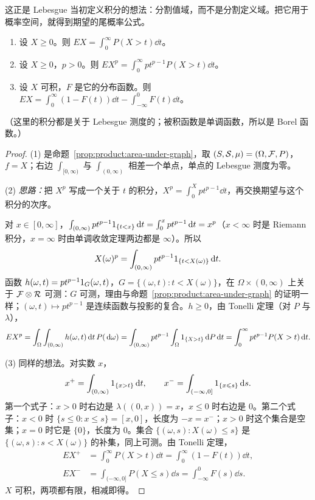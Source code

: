 这正是 Lebesgue 当初定义积分的想法：分割值域，而不是分割定义域。把它用于概率空间，就得到期望的尾概率公式。

\begin{theorem}[期望的尾概率公式]\label{thm:product:tail-formula}
\begin{enumerate}
\item 设 $X\geqslant0$。则 $EX=\int_0^\infty P(X>t)\dd t$。
\item 设 $X\geqslant0$，$p>0$。则 $EX^p=\int_0^\infty pt^{p-1}P(X>t)\dd t$。
\item 设 $X$ 可积，$F$ 是它的分布函数。则 $EX=\int_0^\infty(1-F(t))\dd t-\int_{-\infty}^0F(t)\dd t$。
\end{enumerate}
（这里的积分都是关于 Lebesgue 测度的；被积函数是单调函数，所以是 Borel 函数。）
\end{theorem}
\begin{proof}
(1) 是命题~\ref{prop:product:area-under-graph}，取 $(S,\mathcal{S},\mu)=(\Omega,\mathcal{F},P)$，$f=X$；右边 $\int_{[0,\infty)}$ 与 $\int_{(0,\infty)}$ 相差一个单点，单点的 Lebesgue 测度为零。

(2) \emph{思路：}把 $X^p$ 写成一个关于 $t$ 的积分，$X^p=\int_0^Xpt^{p-1}\dd t$，再交换期望与这个积分的次序。

对 $x\in[0,\infty]$，$\int_{(0,\infty)}pt^{p-1}1_{\{t<x\}}\,\mathrm{d} t=\int_0^xpt^{p-1}\,\mathrm{d} t=x^p$（$x<\infty$ 时是 Riemann 积分，$x=\infty$ 时由单调收敛定理两边都是 $\infty$）。所以
\[
X(\omega)^p=\int_{(0,\infty)}pt^{p-1}1_{\{t<X(\omega)\}}\,\mathrm{d} t .
\]
函数 $h(\omega,t)=pt^{p-1}1_G(\omega,t)$，$G=\{(\omega,t):t<X(\omega)\}$，在 $\Omega\times(0,\infty)$ 上关于 $\mathcal{F}\otimes\mathcal{R}$ 可测：$G$ 可测，理由与命题~\ref{prop:product:area-under-graph} 的证明一样；$(\omega,t)\mapsto pt^{p-1}$ 是连续函数与投影的复合。$h\geqslant0$，由 Tonelli 定理（对 $P$ 与 $\lambda$），
\[
EX^p=\int_\Omega\int_{(0,\infty)}h(\omega,t)\,\mathrm{d} t\,P(\,\mathrm{d}\omega)=\int_{(0,\infty)}pt^{p-1}\int_\Omega1_{\{X>t\}}\,\mathrm{d} P\,\mathrm{d} t=\int_0^\infty pt^{p-1}P(X>t)\,\mathrm{d} t .
\]

(3) 同样的想法。对实数 $x$，
\[
x^+=\int_{(0,\infty)}1_{\{x>t\}}\,\mathrm{d} t,\qquad x^-=\int_{(-\infty,0]}1_{\{x\leqslant s\}}\,\mathrm{d} s .
\]
第一个式子：$x>0$ 时右边是 $\lambda((0,x))=x$，$x\leqslant0$ 时右边是 $0$。第二个式子：$x<0$ 时 $\{s\leqslant0:x\leqslant s\}=[x,0]$，长度为 $-x=x^-$；$x>0$ 时这个集合是空集；$x=0$ 时它是 $\{0\}$，长度为 $0$。集合 $\{(\omega,s):X(\omega)\leqslant s\}$ 是 $\{(\omega,s):s<X(\omega)\}$ 的补集，同上可测。由 Tonelli 定理，
\[
\begin{aligned}
EX^+&=\int_0^\infty P(X>t)\dd t=\int_0^\infty(1-F(t))\dd t,\\
EX^-&=\int_{(-\infty,0]}P(X\leqslant s)\dd s=\int_{-\infty}^0F(s)\dd s .
\end{aligned}
\]
$X$ 可积，两项都有限，相减即得。
\end{proof}

